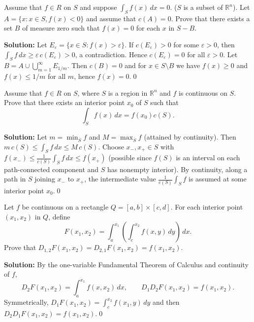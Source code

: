 \begin{problembox}
Assume that \( f \in R \) on \( S \) and suppose \( \int_S f(x) \, dx = 0 \). (\( S \) is a subset of \( \mathbb{R}^n \)). Let \( A = \{ x : x \in S, f(x) < 0 \} \) and assume that \( c(A) = 0 \). Prove that there exists a set \( B \) of measure zero such that \( f(x) = 0 \) for each \( x \) in \( S - B \).
\end{problembox}

\noindent\textbf{Solution:}
Let $E_\varepsilon=\{x\in S:f(x)>\varepsilon\}$. If $c(E_\varepsilon)>0$ for some $\varepsilon>0$, then $\int_S f\,dx\ge \varepsilon\,c(E_\varepsilon)>0$, a contradiction. Hence $c(E_\varepsilon)=0$ for all $\varepsilon>0$. Let $B=A\cup\bigcup_{m=1}^\infty E_{1/m}$. Then $c(B)=0$ and for $x\in S\setminus B$ we have $f(x)\ge 0$ and $f(x)\le 1/m$ for all $m$, hence $f(x)=0$.\qed


\begin{problembox}
Assume that \( f \in R \) on \( S \), where \( S \) is a region in \( \mathbb{R}^n \) and \( f \) is continuous on \( S \). Prove that there exists an interior point \( x_0 \) of \( S \) such that
\[\int_S f(x) \, dx = f(x_0)c(S).\]
\end{problembox}

\noindent\textbf{Solution:}
Let $m=\min_{\overline S} f$ and $M=\max_{\overline S} f$ (attained by continuity). Then $m\,c(S)\le \int_S f\,dx\le M\,c(S)$. Choose $x_-,x_+\in S$ with $f(x_-)\le \frac{1}{c(S)}\int_S f\,dx\le f(x_+)$ (possible since $f(S)$ is an interval on each path-connected component and $S$ has nonempty interior). By continuity, along a path in $S$ joining $x_-$ to $x_+$, the intermediate value $\frac{1}{c(S)}\int_S f$ is assumed at some interior point $x_0$.\qed


\begin{problembox}
Let \( f \) be continuous on a rectangle \( Q = [a, b] \times [c, d] \). For each interior point \( (x_1, x_2) \) in \( Q \), define
\[F(x_1, x_2) = \int_a^{x_1} \left( \int_c^{x_2} f(x, y) \, dy \right) \, dx.\]
Prove that \( D_{1,2} F(x_1, x_2) = D_{2,1} F(x_1, x_2) = f(x_1, x_2) \).
\end{problembox}

\noindent\textbf{Solution:}
By the one-variable Fundamental Theorem of Calculus and continuity of $f$,
\[ D_2 F(x_1,x_2) = \int_a^{x_1} f(x,x_2)\,dx, \qquad D_1 D_2 F(x_1,x_2) = f(x_1,x_2). \]
Symmetrically, $D_1 F(x_1,x_2)=\int_c^{x_2} f(x_1,y)\,dy$ and then $D_2 D_1 F(x_1,x_2)=f(x_1,x_2)$.\qed


